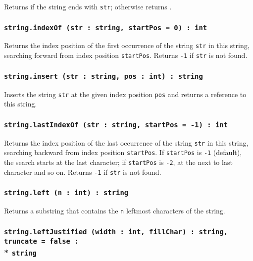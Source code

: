 Returns \true{} if the string ends with \texttt{str}; otherwise returns \false.

\subsubsection{\texttt{string.indexOf (str : string, startPos = 0) : int}}

Returns the index position of the first occurrence of the string \texttt{str} in this string, searching forward from index position \texttt{startPos}. Returns \texttt{-1} if \texttt{str} is not found.

\subsubsection{\texttt{string.insert (str : string, pos : int) : string}}

Inserts the string \texttt{str} at the given index position \texttt{pos} and returns a reference to this string.

\subsubsection{\texttt{string.lastIndexOf (str : string, startPos = -1) : int}}

Returns the index position of the last occurrence of the string \texttt{str} in this string, searching backward from index position \texttt{startPos}. If \texttt{startPos} is \texttt{-1} (default), the search starts at the last character; if \texttt{startPos} is \texttt{-2}, at the next to last character and so on. Returns \texttt{-1} if \texttt{str} is not found.

\subsubsection{\texttt{string.left (n : int) : string}}

Returns a substring that contains the \texttt{n} leftmost characters of the string.

\subsubsection{\texttt{string.leftJustified (width : int, fillChar) : string, truncate = false :}\\* \texttt{string}}

